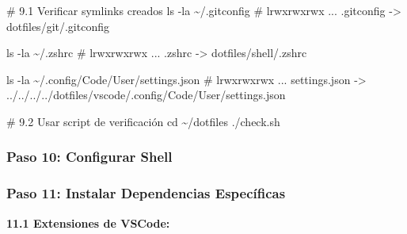 \documentclass[
  doc,
  floatsintext,
  longtable,
  a4paper,
  nolmodern,
  notxfonts,
  notimes,
  12pt,
  colorlinks=true,linkcolor=blue,citecolor=blue,urlcolor=blue]{apa7}
\newenvironment{Shaded}{\begin{snugshade}}{\end{snugshade}}
\newcommand{\AttributeTok}[1]{\textcolor[rgb]{0.40,0.45,0.13}{#1}}
\newcommand{\BuiltInTok}[1]{\textcolor[rgb]{0.00,0.23,0.31}{#1}}
\newcommand{\CommentTok}[1]{\textcolor[rgb]{0.37,0.37,0.37}{#1}}
\newcommand{\ExtensionTok}[1]{\textcolor[rgb]{0.00,0.23,0.31}{#1}}
\newcommand{\FunctionTok}[1]{\textcolor[rgb]{0.28,0.35,0.67}{#1}}
\newcommand{\NormalTok}[1]{\textcolor[rgb]{0.00,0.23,0.31}{#1}}
\newcommand{\VariableTok}[1]{\textcolor[rgb]{0.07,0.07,0.07}{#1}}
\begin{document}
\begin{Shaded}
\begin{Highlighting}[]
\CommentTok{\# 9.1 Verificar symlinks creados}
\FunctionTok{ls} \AttributeTok{{-}la}\NormalTok{ \textasciitilde{}/.gitconfig}
\CommentTok{\# lrwxrwxrwx ... .gitconfig {-}\textgreater{} dotfiles/git/.gitconfig}

\FunctionTok{ls} \AttributeTok{{-}la}\NormalTok{ \textasciitilde{}/.zshrc}
\CommentTok{\# lrwxrwxrwx ... .zshrc {-}\textgreater{} dotfiles/shell/.zshrc}

\FunctionTok{ls} \AttributeTok{{-}la}\NormalTok{ \textasciitilde{}/.config/Code/User/settings.json}
\CommentTok{\# lrwxrwxrwx ... settings.json {-}\textgreater{} ../../../../dotfiles/vscode/.config/Code/User/settings.json}

\CommentTok{\# 9.2 Usar script de verificación}
\BuiltInTok{cd}\NormalTok{ \textasciitilde{}/dotfiles}
\ExtensionTok{./check.sh}
\end{Highlighting}
\end{Shaded}

\subsubsection{Paso 10: Configurar
Shell}\label{paso-10-configurar-shell}

\begin{Shaded}
\end{Shaded}

\subsubsection{Paso 11: Instalar Dependencias
Específicas}\label{paso-11-instalar-dependencias-especuxedficas}

\textbf{11.1 Extensiones de VSCode:}
\end{document}
